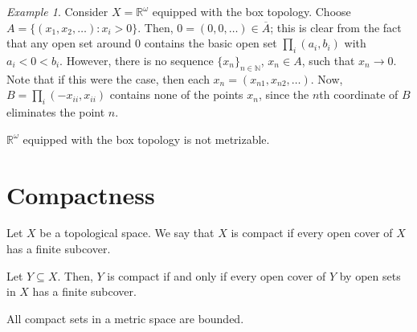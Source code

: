 \documentclass[11pt]{article}
\newcommand{\R}{\mathbb{R}}
\newcommand{\N}{\mathbb{N}}
\theoremstyle{definition}
\theoremstyle{remark}
\newtheorem*{example}{Example}
\numberwithin{equation}{section}
\begin{document}
    \begin{example}
        Consider $X = \R^\omega$ equipped with the box topology. Choose $A = \{(x_1,
        x_2, \dots): x_i > 0\}$. Then, $0 = (0, 0, \dots) \in \overline{A}$; this is
        clear from the fact that any open set around $0$ contains the basic open set
        $\prod_i (a_i, b_i)$ with $a_i < 0 < b_i$. However, there is no sequence
        $\{x_n\}_{n \in \N}$, $x_n \in A$, such that $x_n \to 0$. Note that if this
        were the case, then each $x_n = (x_{n1}, x_{n2}, \dots)$. Now, $B = \prod_i
        (-x_{ii}, x_{ii})$ contains none of the points $x_n$, since the $n$th
        coordinate of $B$ eliminates the point $n$. \\
    \end{example}
    \begin{corollary}
        $\R^\omega$ equipped with the box topology is not metrizable.
    \end{corollary}


    \section{Compactness}
    
    \begin{definition}
        Let $X$ be a topological space. We say that $X$ is compact if every open
        cover of $X$ has a finite subcover.
    \end{definition}

    \begin{lemma}
        Let $Y \subseteq X$. Then, $Y$ is compact if and only if every open cover of
        $Y$ by open sets in $X$ has a finite subcover.
    \end{lemma}

    \begin{lemma}
        All compact sets in a metric space are bounded.
    \end{lemma}
\end{document}
